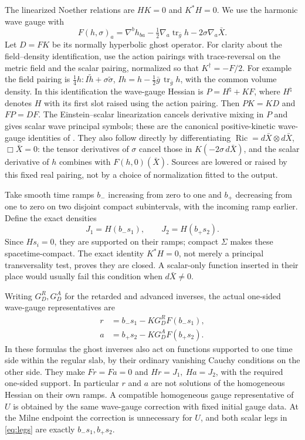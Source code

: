 \documentclass[11pt]{article}
\newcommand{\Ric}{\operatorname{Ric}}
\newcommand{\tr}{\operatorname{tr}}
\numberwithin{equation}{section}
\begin{document}
The linearized Noether relations are \(HK=0\) and \(K^*H=0\).
We use the harmonic wave gauge with
\[
 F(h,\sigma)_a
   =\nabla^b h_{ba}-\tfrac12\nabla_a\tr_{\bar g}h
                         -2\sigma\nabla_a\bar X .
\]
Let \(D=FK\) be its normally hyperbolic ghost operator.
For clarity about the field--density identification, use the
action pairings with trace-reversal on the metric field and
the scalar pairing, normalized so that
\(K^\dagger=-F/2\). For example the field pairing is
\(\tfrac14 h:I\tilde h+\sigma\tilde\sigma\),
\(Ih=h-\tfrac12\bar g\,\tr_{\bar g}h\), with the common
volume density. In this identification the wave-gauge Hessian
is \(P=H^\natural+KF\), where \(H^\natural\) denotes \(H\)
with its first slot raised using the action pairing.
Then \(PK=KD\) and \(FP=DF\). The Einstein--scalar
linearization cancels derivative mixing in \(P\) and gives
scalar wave principal symbols; these are the canonical
positive-kinetic wave-gauge identities of \cite{modular}.
They also follow directly by differentiating
\(\Ric=d\bar X\otimes d\bar X\), \(\Box\bar X=0\):
the tensor derivatives of \(\sigma\) cancel those in
\(K(-2\sigma\,d\bar X)\), and the scalar derivative of \(h\)
combines with \(F(h,0)(\bar X)\). Sources are lowered
or raised by this fixed real pairing, not by a choice of
normalization fitted to the output.

Take smooth time ramps \(b_-\) increasing from zero to one
and \(b_+\) decreasing from one to zero on two disjoint
compact subintervals, with the incoming ramp earlier.
Define the exact densities
\begin{equation}
 J_1=H(b_-s_1),\qquad J_2=H(b_+s_2).
 \label{eq:currents}
\end{equation}
Since \(Hs_i=0\), they are supported on their ramps;
compact \(\Sigma\) makes these spacetime-compact.
The exact identity \(K^*H=0\), not merely a principal
transversality test, proves they are closed. A scalar-only
function inserted in their place would usually fail this
condition when \(d\bar X\ne0\).

Writing \(G_D^R,G_D^A\) for the retarded and advanced inverses,
the actual one-sided wave-gauge representatives are
\begin{align}
 r&=b_-s_1-KG_D^R F(b_-s_1),\\
 a&=b_+s_2-KG_D^A F(b_+s_2).
 \label{eq:legs}
\end{align}
In these formulas the ghost inverses also act on functions
supported to one time side within the regular slab, by their
ordinary vanishing Cauchy conditions on the other side.
They make \(Fr=Fa=0\) and \(Hr=J_1,\ Ha=J_2\), with the
required one-sided support. In particular \(r\) and \(a\)
are not solutions of the homogeneous Hessian on their own
ramps. A compatible homogeneous gauge representative of
\(U\) is obtained by the same wave-gauge correction with
fixed initial gauge data. At the Milne endpoint the correction
is unnecessary for \(U\), and both scalar legs in \eqref{eq:legs}
are exactly \(b_-s_1,b_+s_2\).
\end{document}
